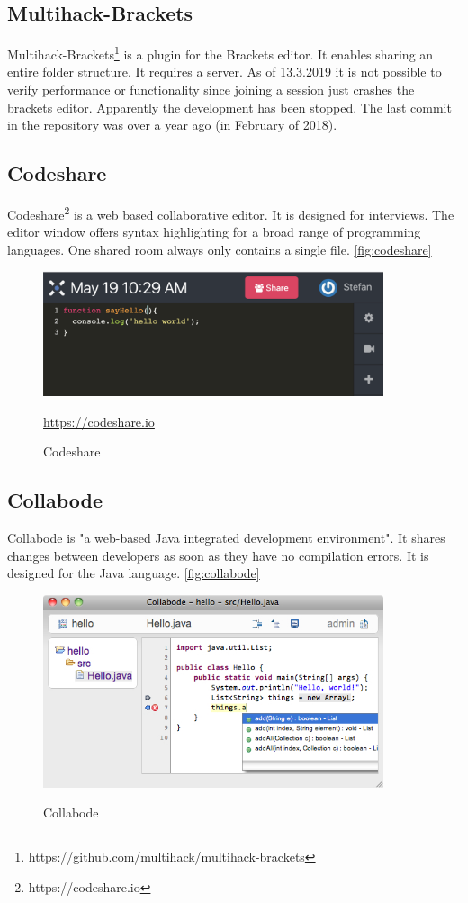 \subsection{Multihack-Brackets}
Multihack-Brackets\footnote{https://github.com/multihack/multihack-brackets} is a plugin for the Brackets editor. It enables sharing an entire folder structure. It requires a server. As of 13.3.2019 it is not possible to verify performance or functionality since joining a session just crashes the brackets editor. Apparently the development has been stopped. The last commit in the repository was over a year ago (in February of 2018).
\subsection{Codeshare}
Codeshare\footnote{https://codeshare.io} is a web based collaborative editor. It is designed for interviews. The editor window offers syntax highlighting for a broad range of programming languages. One shared room always only contains a single file. \autoref{fig:codeshare}
\begin{figure}[h]
    \centering
    \includegraphics[width=100mm]{figures/screenshots/codeshare.png}
	\caption{Codeshare}
	\href{https://codeshare.io}{https://codeshare.io}
    \label{fig:codeshare}
\end{figure}
\subsection{Collabode}
Collabode\cite{Goldman:2011:RCC:2047196.2047215} is "a web-based Java integrated development environment". It shares changes between developers as soon as they have no compilation errors. It is designed for the Java language. \autoref{fig:collabode}
\begin{figure}[h]
    \centering
    \includegraphics[width=100mm]{figures/screenshots/collabode.jpg}
	\caption{Collabode}
	\cite{Goldman:2011:RCC:2047196.2047215}
    \label{fig:collabode}
\end{figure}

